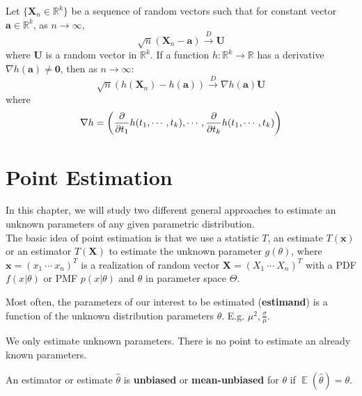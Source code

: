 \documentclass{huhtakm-template-book-v2}
\DeclareMathOperator{\E}{\mathbb{E}}
\begin{document}
\begin{thm}
	Let $\{\mathbf{X}_{n}\in\mathbb{R}^{k}\}$ be a sequence of random vectors such that for constant vector $\mathbf{a}\in\mathbb{R}^{k}$, as $n\to\infty$,
	\begin{equation*}
		\sqrt{n}(\mathbf{X}_{n}-\mathbf{a})\xrightarrow{D}\mathbf{U}
	\end{equation*}
	where $\mathbf{U}$ is a random vector in $\mathbb{R}^{k}$. If a function $h:\mathbb{R}^{k}\to\mathbb{R}$ has a derivative $\nabla h(\mathbf{a})\neq\mathbf{0}$, then as $n\to\infty$:
	\begin{equation*}
		\sqrt{n}(h(\mathbf{X}_{n})-h(\mathbf{a}))\xrightarrow{D}\nabla h(\mathbf{a})\mathbf{U}
	\end{equation*}
	where
	\begin{equation*}
		\nabla h=\left(\pdv*[order=1]{h(t_{1},\cdots,t_{k})}{t_{1}},\cdots,\pdv*[order=1]{h(t_{1},\cdots,t_{k})}{t_{k}}\right)
	\end{equation*}
\end{thm}

\chapter{Point Estimation}
In this chapter, we will study two different general approaches to estimate an unknown parameters of any given parametric distribution.\\
The basic idea of point estimation is that we use a statistic $T$, an estimate $T(\mathbf{x})$ or an estimator $T(\mathbf{X})$ to estimate the unknown parameter $g(\theta)$, where $\mathbf{x}=(x_{1}\ \cdots\ x_{n})^{T}$ is a realization of random vector $\mathbf{X}=(X_{1}\ \cdots\ X_{n})^{T}$ with a PDF $f(x|\theta)$ or PMF $p(x|\theta)$ and $\theta$ in parameter space $\Theta$.
\begin{rem}
	Most often, the parameters of our interest to be estimated (\textbf{estimand}) is a function of the unknown distribution parameters $\theta$. E.g. $\mu^{2},\frac{\sigma}{\mu}$.
\end{rem}
\begin{rem}
	We only estimate unknown parameters. There is no point to estimate an already known parameters.
\end{rem}
\begin{defn}
	An estimator or estimate $\hat{\theta}$ is \textbf{unbiased} or \textbf{mean-unbiased} for $\theta$ if $\E(\hat{\theta})=\theta$.
\end{defn}
\end{document}
